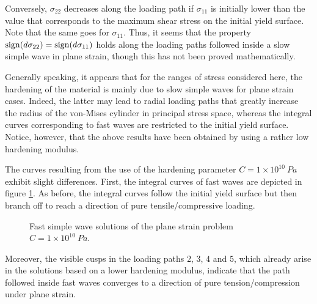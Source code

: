 Conversely, $\sigma_{22}$ decreases along the loading path if $\sigma_{11}$ is initially lower than the value that corresponds to the maximum shear stress on the initial yield surface.
Note that the same goes for $\sigma_{11}$.
Thus, it seems that the property $\operatorname{sign}(d\sigma_{22})=\operatorname{sign}(d\sigma_{11})$ holds along the loading paths followed inside a slow simple wave in plane strain, though this has not been proved mathematically.

Generally speaking, it appears that for the ranges of stress considered here, the hardening of the material is mainly due to slow simple waves for plane strain cases.
Indeed, the latter may lead to radial loading paths that greatly increase the radius of the von-Mises cylinder in principal stress space, whereas the integral curves corresponding to fast waves are restricted to the initial yield surface. Notice, however, that the above results have been obtained by using a rather low hardening modulus.



The curves resulting from the use of the hardening parameter $C=1\times10^{10} \: Pa$ exhibit slight differences.
First, the integral curves of fast waves are depicted in figure \ref{fig:fast_H}.
As before, the integral curves follow the initial yield surface but then branch off to reach a direction of pure tensile/compressive loading.
\begin{figure}[h!]
  \centering
  
  \caption{Fast simple wave solutions of the plane strain problem $C=1\times10^{10} \: Pa$.}
  \label{fig:fast_H}
\end{figure}
Moreover, the visible cusps in the loading paths $2$, $3$, $4$ and $5$, which already arise in the solutions based on a lower hardening modulus, indicate that the path followed inside fast waves converges to a direction of pure tension/compression under plane strain. 

